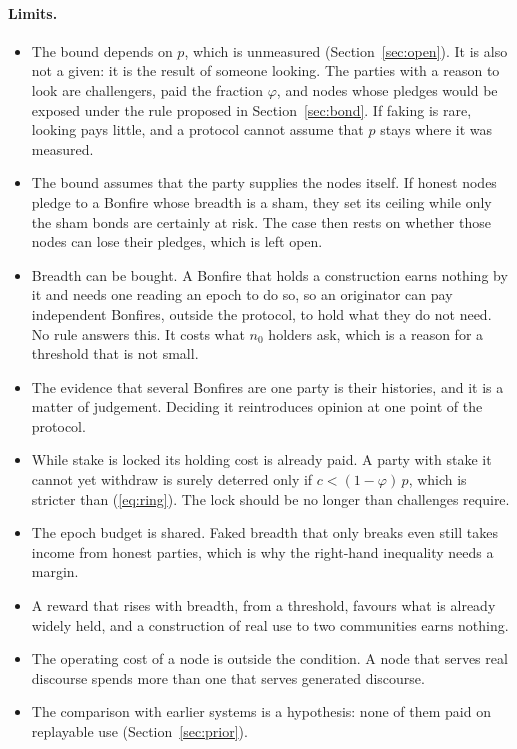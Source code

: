 \paragraph{Limits.}
\begin{itemize}
  \item The bound depends on $p$, which is unmeasured (Section~\ref{sec:open}). It is also not a given: it is the
  result of someone looking. The parties with a reason to look are challengers, paid the fraction $\varphi$, and
  nodes whose pledges would be exposed under the rule proposed in Section~\ref{sec:bond}. If faking is rare,
  looking pays little, and a protocol cannot assume that $p$ stays where it was measured.
  \item The bound assumes that the party supplies the nodes itself. If honest nodes pledge to a Bonfire whose breadth
  is a sham, they set its ceiling while only the sham bonds are certainly at risk. The case then rests on whether
  those nodes can lose their pledges, which is left open.
  \item Breadth can be bought. A Bonfire that holds a construction earns nothing by it and needs one reading an
  epoch to do so, so an originator can pay independent Bonfires, outside the protocol, to hold what they do not
  need. No rule answers this. It costs what $n_0$ holders ask, which is a reason for a threshold that is not small.
  \item The evidence that several Bonfires are one party is their histories, and it is a matter of judgement.
  Deciding it reintroduces opinion at one point of the protocol.
  \item While stake is locked its holding cost is already paid. A party with stake it cannot yet withdraw is surely deterred only if $c < (1-\varphi)\,p$, which is stricter than (\ref{eq:ring}). The lock should be no longer than
  challenges require.
  \item The epoch budget is shared. Faked breadth that only breaks even still takes income from honest parties,
  which is why the right-hand inequality needs a margin.
  \item A reward that rises with breadth, from a threshold, favours what is already widely held, and a
  construction of real use to two communities earns nothing.
  \item The operating cost of a node is outside the condition. A node that serves real discourse spends more than
  one that serves generated discourse.
  \item The comparison with earlier systems is a hypothesis: none of them paid on replayable use
  (Section~\ref{sec:prior}).
\end{itemize}
